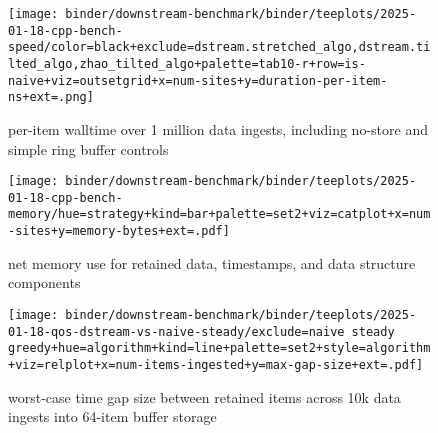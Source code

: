 \begin{figure*}

\begin{subfigure}{\textwidth}
\centering
\texttt{[image: binder/downstream-benchmark/binder/teeplots/2025-01-18-cpp-bench-speed/color=black+exclude=dstream.stretched\_algo,dstream.tilted\_algo,zhao\_tilted\_algo+palette=tab10-r+row=is-naive+viz=outsetgrid+x=num-sites+y=duration-per-item-ns+ext=.png]}
\caption{per-item walltime over 1 million data ingests, including no-store and simple ring buffer controls}
\label{fig:perf:speed}
\end{subfigure}

\begin{subfigure}{0.38\textwidth}
\texttt{[image: binder/downstream-benchmark/binder/teeplots/2025-01-18-cpp-bench-memory/hue=strategy+kind=bar+palette=set2+viz=catplot+x=num-sites+y=memory-bytes+ext=.pdf]}
\centering
\begin{minipage}{0.9\textwidth}
\caption{net memory use for retained data, timestamps, and data structure components}
\label{fig:perf:memory}
\end{minipage}
\end{subfigure}%
\begin{subfigure}{0.62\textwidth}
\texttt{[image: binder/downstream-benchmark/binder/teeplots/2025-01-18-qos-dstream-vs-naive-steady/exclude=naive steady greedy+hue=algorithm+kind=line+palette=set2+style=algorithm+viz=relplot+x=num-items-ingested+y=max-gap-size+ext=.pdf]}
\centering
\begin{minipage}{0.9\textwidth}
\caption{worst-case time gap size between retained items across 10k data ingests into 64-item buffer storage}
\label{fig:perf:qos}
\end{minipage}
\end{subfigure}


\end{figure*}
